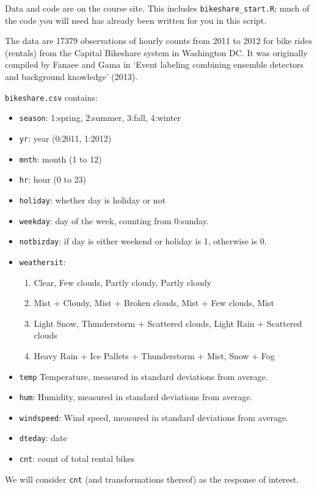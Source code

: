 \documentclass[12pt]{article}
\begin{document}
\pagestyle{empty} 



\bigskip

\noindent
Data and code are on the course site. 
	This includes {\tt bikeshare\_start.R}; 
	much of the code you will need has already been written for you in this script.


\medskip\noindent
The data are 17379 observations of hourly counts from 2011 to 2012 for bike rides (rentals)  from the Capital Bikeshare system in Washington DC. It was originally compiled by Fanaee and Gama in `Event labeling combining ensemble detectors and background knowledge' (2013).

\bigskip\noindent
{}
{\tt bikeshare.csv} contains:
\begin{itemize}
\item \texttt{season}: 1:spring, 2:summer, 3:fall, 4:winter
\item \texttt{yr}: year (0:2011, 1:2012)
\item \texttt{mnth}: month (1 to 12)
\item \texttt{hr}: hour (0 to 23)
\item \texttt{holiday}: whether day is holiday or not
\item \texttt{weekday}: day of the week, counting from 0:sunday.
\item \texttt{notbizday}: if day is either weekend or holiday is 1, otherwise is 0.
\item \texttt{weathersit}: 
\begin{enumerate} 
\item Clear, Few clouds, Partly cloudy, Partly cloudy
\item Mist + Cloudy, Mist + Broken clouds, Mist + Few clouds, Mist
\item Light Snow, Thunderstorm + Scattered clouds, Light Rain + Scattered clouds
\item Heavy Rain + Ice Pallets + Thunderstorm + Mist, Snow + Fog
\end{enumerate}
\item \texttt{temp} Temperature, measured in standard deviations from average. 
\item \texttt{hum}: Humidity, measured in standard deviations from average.
\item \texttt{windspeed}: Wind speed, measured in standard deviations from average.
\item \texttt{dteday}: date
\item \texttt{cnt}: count of total rental bikes
\end{itemize}
We will consider \texttt{cnt} (and transformations thereof) as the response of interest.
\end{document}
